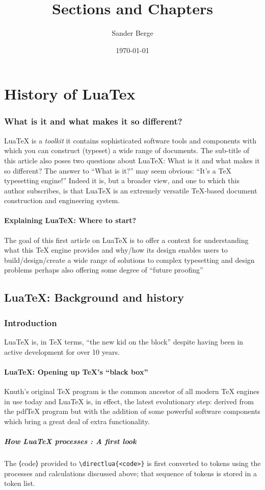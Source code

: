 \documentclass{book}
\title{Sections and Chapters}
\author{Sander Berge}
\date{\today}
\begin{document}
	
	\maketitle
	\tableofcontents
	\part{History of LuaTex}
	\section{What is it and what makes it so different?}
	Lua\TeX{} is a \textit{toolkit} it contains sophisticated software tools and components with which you can construct (typeset) a wide range of documents. The sub-title of this article also poses two questions about Lua\TeX: What is it and what makes it so different? The answer to “What is it?” may seem obvious: “It’s a \TeX{} typesetting engine!” Indeed it is, but a broader view, and one to which this author subscribes, is that Lua\TeX{} is an extremely versatile \TeX-based document construction and engineering system.
	
	\subsection{Explaining Lua\TeX: Where to start?}
	The goal of this first article on Lua\TeX{} is to offer a context for understanding what this TeX engine provides and why/how its design enables users to build/design/create a wide range of solutions to complex typesetting and design problems perhaps also offering some degree of “future proofing” 
	
	\chapter{Lua\TeX: Background and history}
	\section{Introduction}
	Lua\TeX{} is, in \TeX{} terms, “the new kid on the block” despite having been in active development for over 10 years.
	
	\subsection{Lua\TeX: Opening up \TeX’s “black box”}
	Knuth’s original \TeX{} program is the common ancestor of all modern \TeX{} engines in use today and Lua\TeX{} is, in effect, the latest evolutionary step: derived from the pdf\TeX{} program but with the addition of some powerful software components which bring a great deal of extra functionality.
	
	\subsubsection{How Lua\TeX{} processes \texttt{\string\directlua}: A first look}
	The ⟨code⟩ provided to \verb|\directlua{<code>}| is first converted to tokens using the processes and calculations discussed above; that sequence of tokens is stored in a token list.
\end{document}
